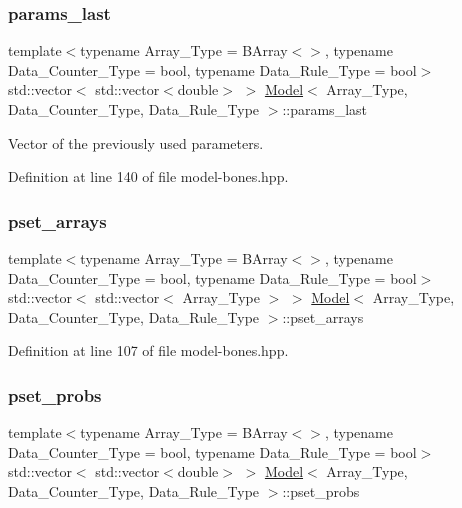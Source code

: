 \subsubsection{\texorpdfstring{params\+\_\+last}{params\_last}}
{\footnotesize\ttfamily template$<$typename Array\+\_\+\+Type  = B\+Array$<$$>$, typename Data\+\_\+\+Counter\+\_\+\+Type  = bool, typename Data\+\_\+\+Rule\+\_\+\+Type  = bool$>$ \\
std\+::vector$<$ std\+::vector$<$double$>$ $>$ \hyperlink{class_model}{Model}$<$ Array\+\_\+\+Type, Data\+\_\+\+Counter\+\_\+\+Type, Data\+\_\+\+Rule\+\_\+\+Type $>$\+::params\+\_\+last}



Vector of the previously used parameters. 



Definition at line 140 of file model-\/bones.\+hpp.

\mbox{\label{class_model_a875ac0dbc320797c843b6724b7736f77}} 
\subsubsection{\texorpdfstring{pset\+\_\+arrays}{pset\_arrays}}
{\footnotesize\ttfamily template$<$typename Array\+\_\+\+Type  = B\+Array$<$$>$, typename Data\+\_\+\+Counter\+\_\+\+Type  = bool, typename Data\+\_\+\+Rule\+\_\+\+Type  = bool$>$ \\
std\+::vector$<$ std\+::vector$<$ Array\+\_\+\+Type $>$ $>$ \hyperlink{class_model}{Model}$<$ Array\+\_\+\+Type, Data\+\_\+\+Counter\+\_\+\+Type, Data\+\_\+\+Rule\+\_\+\+Type $>$\+::pset\+\_\+arrays}



Definition at line 107 of file model-\/bones.\+hpp.

\mbox{\label{class_model_a5dea24375889e55064f052fd8e8c4fe2}} 
\subsubsection{\texorpdfstring{pset\+\_\+probs}{pset\_probs}}
{\footnotesize\ttfamily template$<$typename Array\+\_\+\+Type  = B\+Array$<$$>$, typename Data\+\_\+\+Counter\+\_\+\+Type  = bool, typename Data\+\_\+\+Rule\+\_\+\+Type  = bool$>$ \\
std\+::vector$<$ std\+::vector$<$double$>$ $>$ \hyperlink{class_model}{Model}$<$ Array\+\_\+\+Type, Data\+\_\+\+Counter\+\_\+\+Type, Data\+\_\+\+Rule\+\_\+\+Type $>$\+::pset\+\_\+probs}



